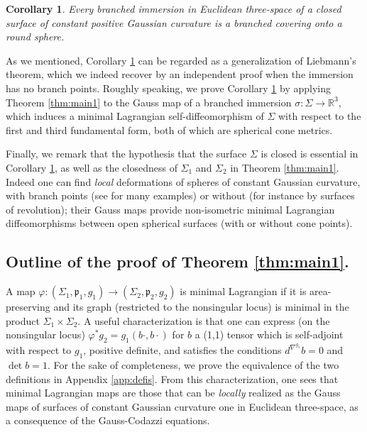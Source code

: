 \documentclass[11pt]{article}
\newtheorem{cor}{Corollary}[section]
\theoremstyle{definition}
\newcommand{\R}{{\mathbb R}}
\begin{document}
\begin{cor}\label{cor:rigidity}
Every branched immersion in Euclidean three-space of a closed surface of constant positive Gaussian curvature is a branched covering onto a round sphere.
\end{cor}

As we mentioned, Corollary \ref{cor:rigidity} can be regarded as a generalization of Liebmann's theorem, which we indeed recover by an independent proof when the immersion has no branch points. Roughly speaking, we prove Corollary \ref{cor:rigidity} by applying Theorem \ref{thm:main1} to the Gauss map of a branched immersion $\sigma:\Sigma\to\R^3$, which induces a minimal Lagrangian self-diffeomorphism of $\Sigma$ with respect to the first and third fundamental form, both of which are spherical cone metrics.

Finally, we remark that the hypothesis that the surface $\Sigma$ is closed is essential in Corollary \ref{cor:rigidity}, as well as the closedness of $\Sigma_1$ and $\Sigma_2$ in Theorem \ref{thm:main1}. Indeed one can find \emph{local} deformations of spheres of constant Gaussian curvature, with branch points (see \cite{zbMATH06599450} for many examples) or without (for instance by surfaces of revolution); their Gauss maps provide non-isometric minimal Lagrangian diffeomorphisms between open spherical surfaces (with or without cone points).

\subsection{Outline of the proof of Theorem \ref{thm:main1}.} \label{sec:outline}

A map $\varphi:(\Sigma_1,\mathfrak p_1,g_1)\to(\Sigma_2,\mathfrak p_2,g_2)$ is minimal Lagrangian if it is area-preserving and its graph (restricted to the nonsingular locus) is minimal in the product $\Sigma_1\times\Sigma_2$. A useful characterization is that one can express (on the nonsingular locus) $\varphi^*g_2=g_1(b\cdot,b\cdot)$ for $b$ a (1,1) tensor which is self-adjoint with respect to $g_1$, positive definite, and satisfies the conditions $d^{\nabla^{g_1}}\!b=0$ and $\det b=1$. For the sake of completeness, we prove the equivalence of the two definitions in Appendix \ref{app:defis}. From this characterization, one sees that minimal Lagrangian maps are those that can be \emph{locally} realized as the Gauss maps of surfaces of constant Gaussian curvature one in Euclidean three-space, as a consequence of the Gauss-Codazzi equations.
\end{document}
